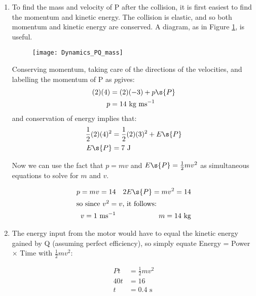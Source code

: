 \begin{problem}[AO1984PIQ1a]
{\begin{enumerate}
In order to work out the maximum tension; we need to relate the tension in the elastic to the extension: the force required to stretch the elastic is $\vtr{F} = k\vtr{x}$ where $k$ is commonly called the spring constant, and so the tension, which is equal in magnitude but opposite in sign, must be $kx$. The constant $k$ can be found by considering the energy stored $E = \frac{1}{2}kx^{2}$ and we know both $E$ and $x$:
\begin{equation*} k = \frac{E}{x^{2}} = \frac{16}{(0.5)^{2}} \textrm{ N m}^{-1} = 128 \textrm{ N m}^{-1} \end{equation*}
and so the tension, which is maximum at the maximum extension, is:
\begin{equation*} T\s{max} = kx = (128)(0.5) \textrm{ N} = 64 \textrm{ N} \end{equation*}
	\item To find the mass and velocity of P after the collision, it is first easiest to find the momentum and kinetic energy. The collision is elastic, and so both momentum and kinetic energy are conserved. A diagram, as in Figure \ref{fig:Dynamics_PQ_mass}, is useful.
	
\begin{figure}[h]
	\centering
	\texttt{[image: Dynamics\_PQ\_mass]}
	\caption{}
	\label{fig:Dynamics_PQ_mass}
\end{figure}

Conserving momentum, taking care of the directions of the velocities, and labelling the momentum of P as $p$gives:
\begin{align*} (2)(4) &= (2)(-3) + p\s{P}  \\ p &= 14 \textrm{ kg ms}^{-1}\end{align*}
and conservation of energy implies that:
\begin{align*} \frac{1}{2}(2)(4)^{2} &= \frac{1}{2}(2)(3)^{2} + E\s{P}  \\ E\s{P} &= 7 \textrm{ J} \end{align*}

Now we can use the fact that $p = mv$ and $E\s{P} = \frac{1}{2}mv^{2}$ as simultaneous equations to solve for $m$ and $v$.

\begin{align*} p = mv = 14 &&  2E\s{P} = mv^{2} = 14 \\ \intertext{so since $v^{2} = v$, it follows:} v = 1 \textrm{ ms}^{-1} && m = 14 \textrm{ kg} \end{align*}

	\item The energy input from the motor would have to equal the kinetic energy gained by Q (assuming perfect efficiency), so simply equate Energy = Power $\times$ Time with $\frac{1}{2}mv^{2}$:

\begin{align*} Pt &= \frac{1}{2}mv^{2} \\ 40t &= 16 \\ t&=0.4\textrm{ s} \end{align*}

\end{enumerate}
}
\end{problem}